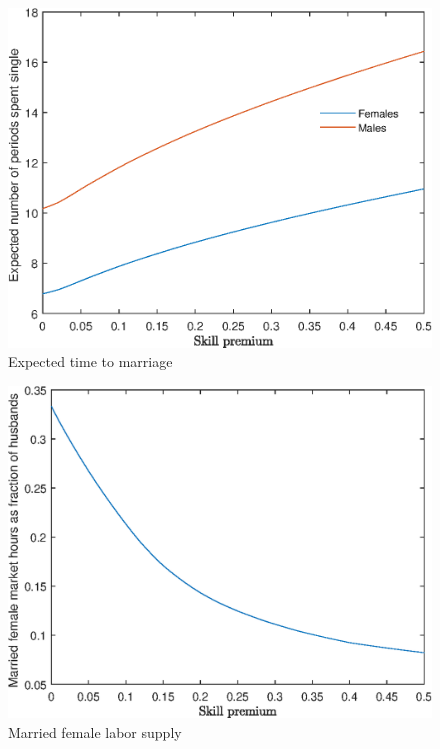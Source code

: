 \documentclass[12pt]{article}
\begin{document}
\begin{figure}
	\centering
	\caption{Expected time to marriage}
	\includegraphics{Graphs/exp_single_skill_premium_ex1.eps}
\end{figure}

\begin{figure}
	\centering
	\caption{Married female labor supply}
	\includegraphics{Graphs/lf_skill_premium_ex1.eps}
\end{figure}
\end{document}
